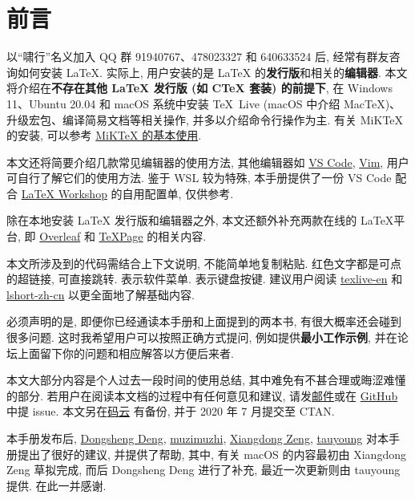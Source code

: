 
\chapter*{前言}

以``啸行''名义加入 QQ 群 91940767、478023327 和 640633524 后,
经常有群友咨询如何安装 \LaTeX.
实际上,
用户安装的是 \LaTeX{} 的\textbf{发行版}和相关的\textbf{编辑器}.
本文将介绍在\textbf{不存在其他 \LaTeX{} 发行版 (如 C\TeX{} 套装) 的前提下},
在 Windows 11、Ubuntu 20.04 和 macOS 系统中安装
\TeX{}~Live (macOS 中介绍 Mac\TeX)、升级宏包、编译简易文档等相关操作,
并多以介绍命令行操作为主.
有关 MiK\TeX{} 的安装,
可以参考 \href{https://camusecao.top/2021-06-16/MiKTeX/}{MiK\TeX{} 的基本使用}.

本文还将简要介绍几款常见编辑器的使用方法,
其他编辑器如 \href{https://code.visualstudio.com/}{VS Code},
\href{https://www.vim.org/}{Vim},
用户可自行了解它们的使用方法.
鉴于 WSL 较为特殊,
本手册提供了一份 VS Code 配合
\href{https://marketplace.visualstudio.com/items?itemName=James-Yu.latex-workshop}{LaTeX Workshop}
的自用配置单,
仅供参考.

除在本地安装 \LaTeX{} 发行版和编辑器之外,
本文还额外补充两款在线的 \LaTeX 平台,
即 \href{http://www.overleaf.com}{Overleaf} 和 \href{https://www.texpage.com/}{TeXPage} 的相关内容.

本文所涉及到的代码需结合上下文说明, 不能简单地复制粘贴. 红色文字都是可点的超链接, 可直接跳转.
 表示软件菜单.  表示键盘按键.
建议用户阅读 \href{https://www.tug.org/texlive/doc/texlive-en/texlive-en.pdf}{texlive-en}
和 \href{http://mirrors.ctan.org/info/lshort/chinese/lshort-zh-cn.pdf}{lshort-zh-cn}
以更全面地了解基础内容.

必须声明的是,
即便你已经通读本手册和上面提到的两本书,
有很大概率还会碰到很多问题.
这时我希望用户可以按照正确方式提问,
例如提供\textbf{最小工作示例},
并在论坛上面留下你的问题和相应解答以方便后来者.

本文大部分内容是个人过去一段时间的使用总结, 其中难免有不甚合理或晦涩难懂的部分. 
若用户在阅读本文档的过程中有任何意见和建议,
请发\href{mailto:ranwang.osbert@outlook.com}{邮件}或在
\href{https://github.com/OsbertWang/install-latex-guide-zh-cn/}{GitHub} 中提 issue.
本文另在\href{https://gitee.com/OsbertWang/install-latex-guide-zh-cn}{码云}%
有备份,
并于 2020 年 7 月提交至 CTAN.


本手册发布后,
\href{https://github.com/EthanDeng}{Dongsheng Deng},
\href{https://github.com/muzimuzhi}{muzimuzhi},
\href{https://github.com/stone-zeng}{Xiangdong Zeng},
\href{https://github.com/tauyoungsama}{tauyoung}
对本手册提出了很好的建议, 并提供了帮助,
其中, 有关 macOS 的内容最初由 Xiangdong Zeng 草拟完成,
而后 Dongsheng Deng 进行了补充,
最近一次更新则由 tauyoung 提供.
在此一并感谢.
